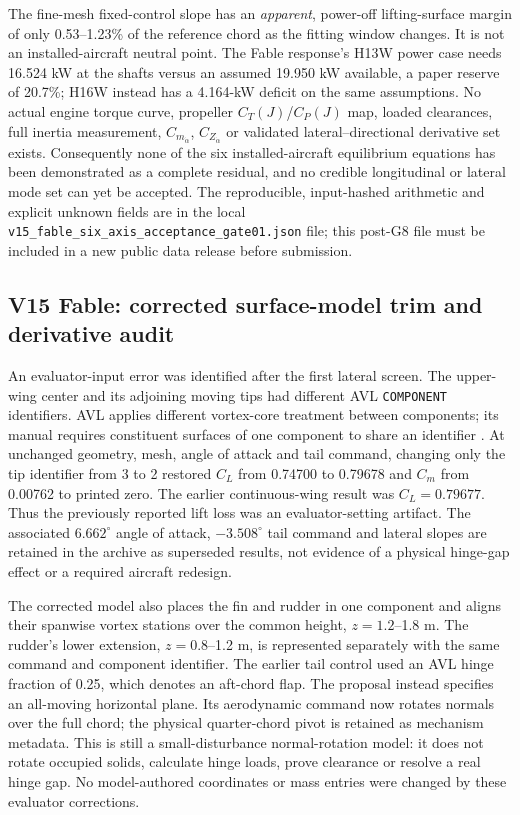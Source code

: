 \documentclass[10pt,letterpaper]{article}
\begin{document}
The fine-mesh fixed-control slope has an \emph{apparent}, power-off
lifting-surface margin of only 0.53--1.23\% of the reference chord as the
fitting window changes. It is not an installed-aircraft neutral point.
The Fable response's H13W power case needs 16.524 kW at the shafts versus
an assumed 19.950 kW available, a paper reserve of 20.7\%; H16W instead
has a 4.164-kW deficit on the same assumptions. No actual engine torque
curve, propeller $C_T(J)$/$C_P(J)$ map, loaded clearances, full inertia
measurement, $C_{m_{\dot\alpha}}$, $C_{Z_{\dot\alpha}}$ or validated
lateral--directional derivative set exists. Consequently none of the six
installed-aircraft equilibrium equations has been demonstrated as a
complete residual, and no credible longitudinal or lateral mode set can
yet be accepted. The reproducible, input-hashed arithmetic and explicit
unknown fields are in the local
\texttt{v15\_fable\_six\_axis\_acceptance\_gate01.json} file; this
post-G8 file must be included in a new public data release before submission.

\subsection{V15 Fable: corrected surface-model trim and derivative audit}
\label{sec:v15-fable-lateral}

An evaluator-input error was identified after the first lateral screen.
The upper-wing center and its adjoining moving tips had different AVL
\texttt{COMPONENT} identifiers. AVL applies different vortex-core treatment
between components; its manual requires constituent surfaces of one component
to share an identifier \cite{ref22}. At unchanged geometry, mesh, angle of
attack and tail command, changing only the tip identifier from 3 to 2 restored
$C_L$ from 0.74700 to 0.79678 and $C_m$ from 0.00762 to printed zero.
The earlier continuous-wing result was $C_L=0.79677$. Thus the previously
reported lift loss was an evaluator-setting artifact. The associated
$6.662^\circ$ angle of attack, $-3.508^\circ$ tail command and lateral slopes
are retained in the archive as superseded results, not evidence of a physical
hinge-gap effect or a required aircraft redesign.

The corrected model also places the fin and rudder in one component and
aligns their spanwise vortex stations over the common height, $z=1.2$--1.8 m.
The rudder's lower extension, $z=0.8$--1.2 m, is represented separately with
the same command and component identifier. The earlier tail control used
an AVL hinge fraction of 0.25, which denotes an aft-chord flap. The proposal
instead specifies an all-moving horizontal plane. Its aerodynamic command
now rotates normals over the full chord; the physical quarter-chord pivot
is retained as mechanism metadata. This is still a small-disturbance
normal-rotation model: it does not rotate occupied solids, calculate hinge
loads, prove clearance or resolve a real hinge gap. No model-authored
coordinates or mass entries were changed by these evaluator corrections.
\end{document}
